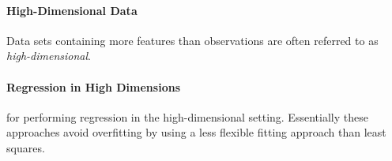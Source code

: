 \paragraph{High-Dimensional Data}
Data sets containing more features than observations are often referred
to as \emph{high-dimensional}. 


\paragraph{Regression in High Dimensions}
 for performing regression in the high-dimensional
setting. Essentially these approaches avoid overfitting by using a 
less flexible fitting approach than least squares.

